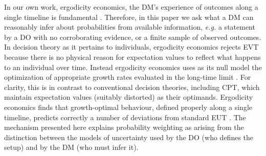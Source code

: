 \documentclass[a4paper, 12pt]{article}
\newcommand{\eg}{\textit{e.g.}\xspace}
\begin{document}

In our own work, ergodicity economics, the DM's experience of outcomes along a single timeline is fundamental \parencite{Peters2019b}. Therefore, in this paper we ask what a DM can reasonably infer about probabilities from available information, \eg a statement by a DO with no corroborating evidence, or a finite sample of observed outcomes. In decision theory as it pertains to individuals, ergodicity economics rejects EVT because there is no physical reason for expectation values to reflect what happens to an individual over time. Instead ergodicity economics uses as its null model the optimization of appropriate growth rates evaluated in the long-time limit \parencite{Peters2011a,Peters2011b,Peters2019b}. For clarity, this is in contrast to conventional decision theories, including CPT, which maintain expectation values (suitably distorted) as their optimands. Ergodicity economics finds that growth-optimal behaviour, defined properly along a single timeline, predicts correctly a number of deviations from standard EUT \parencite{MederETAL2019,AdamouETAL2019,BermanKirstein2020}. The mechanism presented here explains probability weighting as arising from the distinction between the models of uncertainty used by the DO (who defines the setup) and by the DM (who must infer it).
\end{document}
